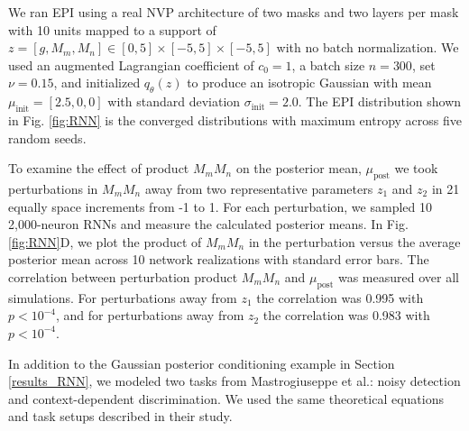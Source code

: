 \documentclass[11pt]{article}
\begin{document}
We ran EPI using a real NVP architecture of two masks and two layers per mask with 10 units mapped to a support of $z = [g, M_m, M_n] \in [0,5] \times [-5,5] \times[-5,5]$ with no batch normalization. 
We used an augmented Lagrangian coefficient of $c_0 = 1$, a batch size $n=300$, set $\nu = 0.15$, and initialized $q_\theta(z)$ to produce an isotropic Gaussian with mean $\mu_{\text{init}} = [2.5, 0, 0]$ with standard deviation $\sigma_{\text{init}} = 2.0$.
 The EPI distribution shown in Fig. \ref{fig:RNN} is the converged distributions with maximum entropy across five random seeds.

To examine the effect of product $M_m M_n$ on the posterior mean, $\mu_{\text{post}}$ we took perturbations in $M_m M_n$ away from two representative parameters  $z_1$ and $z_2$ in 21 equally space increments from -1 to 1.  For each perturbation, we sampled 10 2,000-neuron RNNs and measure the calculated posterior means.  In Fig. \ref{fig:RNN}D, we plot the product of $M_m M_n$ in the perturbation versus the average posterior mean across 10 network realizations with standard error bars.  The correlation between perturbation product $M_m M_n$ and $\mu_{\text{post}}$ was measured over all simulations.  For perturbations away from $z_1$ the correlation was 0.995 with $p<10^{-4}$, and for perturbations away from $z_2$ the correlation was 0.983 with $p<10^{-4}$.

In addition to the Gaussian posterior conditioning example in Section \ref{results_RNN}, we modeled two tasks from Mastrogiuseppe et al.: noisy detection and context-dependent discrimination.  We used the same theoretical equations and task setups described in their study.


\end{document}
